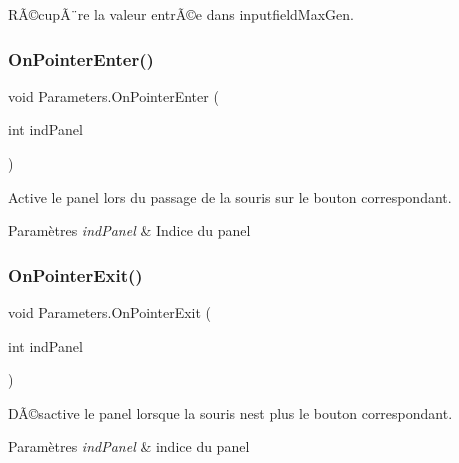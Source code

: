 RÃ©cupÃ¨re la valeur entrÃ©e dans inputfield\+Max\+Gen. 

\mbox{\label{class_parameters_aa0a97bc80e6c1cdf8a43513c187f33aa}} 
\subsubsection{\texorpdfstring{On\+Pointer\+Enter()}{OnPointerEnter()}}
{\footnotesize\ttfamily void Parameters.\+On\+Pointer\+Enter (\begin{DoxyParamCaption}\item[{int}]{ind\+Panel }\end{DoxyParamCaption})\hspace{0.3cm}{\ttfamily [inline]}}



Active le panel lors du passage de la souris sur le bouton correspondant. 


\begin{DoxyParams}{Paramètres}
{\em ind\+Panel} & Indice du panel\\
\hline
\end{DoxyParams}
\mbox{\label{class_parameters_a711df8be88106725f5e1cf4bf74a5e21}} 
\subsubsection{\texorpdfstring{On\+Pointer\+Exit()}{OnPointerExit()}}
{\footnotesize\ttfamily void Parameters.\+On\+Pointer\+Exit (\begin{DoxyParamCaption}\item[{int}]{ind\+Panel }\end{DoxyParamCaption})\hspace{0.3cm}{\ttfamily [inline]}}



DÃ©sactive le panel lorsque la souris n\textquotesingle{}est plus le bouton correspondant. 


\begin{DoxyParams}{Paramètres}
{\em ind\+Panel} & indice du panel\\
\hline
\end{DoxyParams}
\mbox{\label{class_parameters_ae90c0f90420620d98950ac50b9f24782}} 
